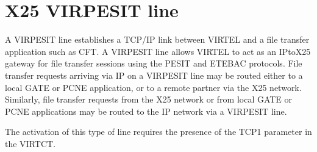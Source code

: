 \documentclass[letterpaper,10pt,english]{sphinxmanual}
\begin{document}
\begin{sphinxVerbatim}[commandchars=\\\{\}]
  
  
  
  
\end{sphinxVerbatim}

\newpage

\ignorespaces 

\section{X25 VIRPESIT line}
\label{\detokenize{connectivity_guide:x25-virpesit-line}}\label{\detokenize{connectivity_guide:index-55}}
\sphinxAtStartPar
A VIRPESIT line establishes a TCP/IP link between VIRTEL and a file transfer application such as CFT. A VIRPESIT line allows VIRTEL to act as an IP\sphinxhyphen{}to\sphinxhyphen{}X25 gateway for file transfer sessions using the PESIT and ETEBAC protocols. File transfer requests arriving via IP on a VIRPESIT line may be routed either to a local GATE or PCNE application, or to a remote partner via the X25 network. Similarly, file transfer requests from the X25 network or from local GATE or PCNE applications may be routed to the IP network via a VIRPESIT line.

\sphinxAtStartPar
The activation of this type of line requires the presence of the TCP1 parameter in the VIRTCT.

\sphinxAtStartPar
{}

\ignorespaces 
\end{document}
